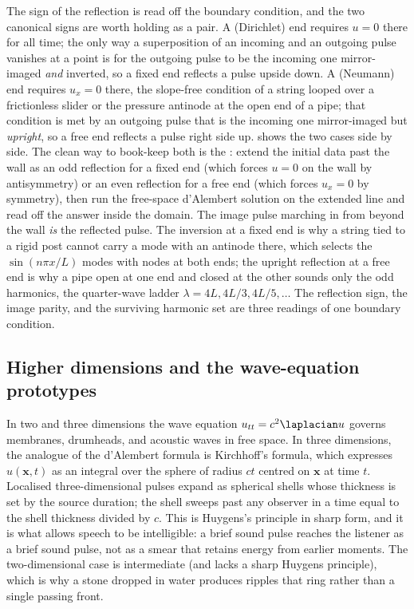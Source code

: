 The sign of the reflection is read off the boundary condition, and
the two canonical signs are worth holding as a pair. A
 (Dirichlet) end requires $u = 0$ there for all time;
the only way a superposition of an incoming and an outgoing pulse
vanishes at a point is for the outgoing pulse to be the incoming one
mirror-imaged \emph{and} inverted, so a fixed end reflects a pulse
upside down. A  (Neumann) end requires $u_{x} = 0$
there, the slope-free condition of a string looped over a
frictionless slider or the pressure antinode at the open end of a
pipe; that condition is met by an outgoing pulse that is the incoming
one mirror-imaged but \emph{upright}, so a free end reflects a pulse
right side up.  shows the two cases
side by side. The clean way to book-keep both is the
: extend the initial data past the wall as
an odd reflection for a fixed end (which forces $u = 0$ on the wall
by antisymmetry) or an even reflection for a free end (which forces
$u_{x} = 0$ by symmetry), then run the free-space d'Alembert solution
on the extended line and read off the answer inside the domain. The
image pulse marching in from beyond the wall \emph{is} the reflected
pulse. The inversion at a fixed end is why a string tied to a rigid
post cannot carry a mode with an antinode there, which selects the
$\sin(n\pi x/L)$ modes with nodes at both ends; the upright
reflection at a free end is why a pipe open at one end and closed at
the other sounds only the odd harmonics, the quarter-wave ladder
$\lambda = 4L, 4L/3, 4L/5, \ldots$ The reflection sign, the image
parity, and the surviving harmonic set are three readings of one
boundary condition.



\subsection{Higher dimensions and the wave-equation prototypes}

In two and three dimensions the wave equation $u_{tt} = c^{2}
\laplacian u$ governs membranes, drumheads, and acoustic waves in
free space. In three dimensions, the analogue of the d'Alembert
formula is Kirchhoff's formula, which expresses $u(\mathbf{x}, t)$
as an integral over the sphere of radius $c t$ centred on
$\mathbf{x}$ at time $t$. Localised three-dimensional pulses
expand as spherical shells whose thickness is set by the source
duration; the shell sweeps past any observer in a time equal to
the shell thickness divided by $c$. This is Huygens's principle in
sharp form, and it is what allows speech to be intelligible: a
brief sound pulse reaches the listener as a brief sound pulse, not
as a smear that retains energy from earlier moments. The
two-dimensional case is intermediate (and lacks a sharp Huygens
principle), which is why a stone dropped in water produces ripples
that ring rather than a single passing front.

